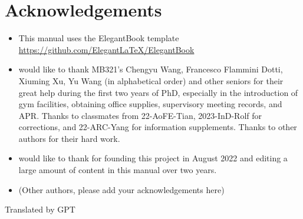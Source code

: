 \chapter{Acknowledgements}
\begin{itemize}
    \item This manual uses the ElegantBook template \url{https://github.com/ElegantLaTeX/ElegantBook}
    \item \Wu \space would like to thank MB321's Chengyu Wang, Francesco Flammini Dotti, Xiuming Xu, Yu Wang (in alphabetical order) and other seniors for their great help during the first two years of PhD, especially in the introduction of gym facilities, obtaining office supplies, supervisory meeting records, and APR. Thanks to classmates from 22-AoFE-Tian, 2023-InD-Rolf for corrections, and 22-ARC-Yang for information supplements. Thanks to other authors for their hard work.
    \item \Shiyao \space would like to thank \Wu \space for founding this project in August 2022 and editing a large amount of content in this manual over two years.
    \item (Other authors, please add your acknowledgements here)
\end{itemize}



\begin{flushright}
    Translated by GPT
\end{flushright}